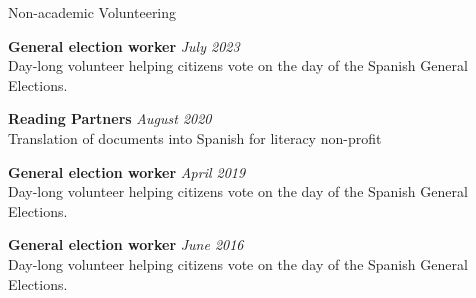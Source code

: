 \documentclass{resume}
\newcommand{\cvitem}[3]{
    {\bf #1} \hfill {\em \small #2} \\ 
    {\small#3 }
}
\begin{document}
\begin{rSection}{Non-academic Volunteering}

\cvitem{General election worker}{July 2023}{Day-long volunteer helping citizens vote on the day of the Spanish General Elections.}

\cvitem{Reading Partners}{August 2020}{Translation of documents into Spanish for literacy non-profit}

\cvitem{General election worker}{April 2019}{Day-long volunteer helping citizens vote on the day of the Spanish General Elections.}

\cvitem{General election worker}{June 2016}{Day-long volunteer helping citizens vote on the day of the Spanish General Elections.}

\end{rSection}
\end{document}
